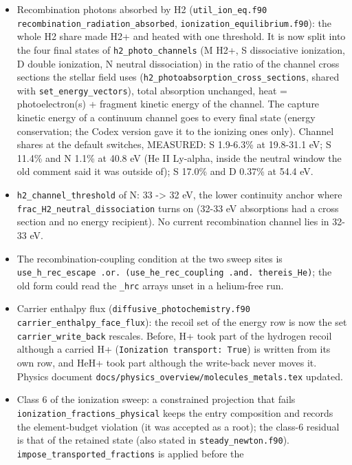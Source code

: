 \documentclass[english,a4paper]{my_memo}
\providecommand{\tightlist}{\setlength{\itemsep}{0pt}\setlength{\parskip}{0pt}}
\begin{document}
\begin{itemize}
\tightlist
\item
  Recombination photons absorbed by H2 (\texttt{util\_ion\_eq.f90}
  \texttt{recombination\_radiation\_absorbed}, \texttt{ionization\_equilibrium.f90}): the
  whole H2 share made H2+ and heated with one threshold. It is now split
  into the four final states of \texttt{h2\_photo\_channels} (M H2+, S dissociative
  ionization, D double ionization, N neutral dissociation) in the ratio of
  the channel cross sections the stellar field uses
  (\texttt{h2\_photoabsorption\_cross\_sections}, shared with \texttt{set\_energy\_vectors}),
  total absorption unchanged, heat = photoelectron(s) + fragment kinetic
  energy of the channel. The capture kinetic energy of a continuum channel
  goes to every final state (energy conservation; the Codex version gave it
  to the ionizing ones only). Channel shares at the default switches,
  MEASURED: S 1.9-6.3\% at 19.8-31.1 eV; S 11.4\% and N 1.1\% at 40.8 eV
  (He II Ly-alpha, inside the neutral window the old comment said it was
  outside of); S 17.0\% and D 0.37\% at 54.4 eV.
\item
  \texttt{h2\_channel\_threshold} of N: 33 -\textgreater{} 32 eV, the lower continuity anchor
  where \texttt{frac\_H2\_neutral\_dissociation} turns on (32-33 eV absorptions had a
  cross section and no energy recipient). No current recombination channel
  lies in 32-33 eV.
\item
  The recombination-coupling condition at the two sweep sites is
  \texttt{use\_h\_rec\_escape\ .or.\ (use\_he\_rec\_coupling\ .and.\ thereis\_He)}; the old
  form could read the \texttt{\_hrc} arrays unset in a helium-free run.
\item
  Carrier enthalpy flux (\texttt{diffusive\_photochemistry.f90}
  \texttt{carrier\_enthalpy\_face\_flux}): the recoil set of the energy row is now the
  set \texttt{carrier\_write\_back} rescales. Before, H+ took part of the hydrogen
  recoil although a carried H+ (\texttt{Ionization\ transport:\ True}) is written from
  its own row, and HeH+ took part although the write-back never moves it.
  Physics document \texttt{docs/physics\_overview/molecules\_metals.tex} updated.
\item
  Class 6 of the ionization sweep: a constrained projection that fails
  \texttt{ionization\_fractions\_physical} keeps the entry composition and records
  the element-budget violation (it was accepted as a root); the class-6
  residual is that of the retained state (also stated in
  \texttt{steady\_newton.f90}). \texttt{impose\_transported\_fractions} is applied before the

\end{itemize}
\end{document}
